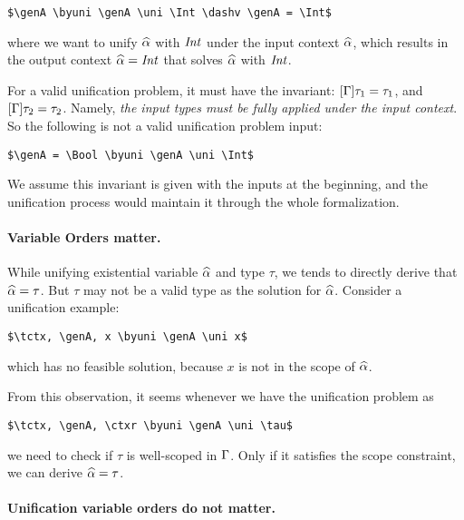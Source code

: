 \begin{lstlisting}
$\genA \byuni \genA \uni \Int \dashv \genA = \Int$
\end{lstlisting}

\noindent where we want to unify $\widehat{\alpha}$ with $\mathit{Int}$ under the input context
$\widehat{\alpha}$, which results in the output context $\widehat{\alpha} = \mathit{Int}$ that solves $\widehat{\alpha}$
with $\mathit{Int}$.

For a valid unification problem, it must have the invariant: $[\Gamma] \tau_1 =
\tau_1$, and $[\Gamma] \tau_2 = \tau_2$. Namely,
\textit{the input types must be
fully applied under the input context}.
 So the following is not a valid
unification problem input:

\begin{lstlisting}
$\genA = \Bool \byuni \genA \uni \Int$
\end{lstlisting}

We assume this invariant is given with the inputs at the beginning,
and the unification process would maintain it through the whole
formalization.

\paragraph{Variable Orders matter.}

While unifying existential variable $\widehat{\alpha}$ and type $\tau$, we tends to
directly derive that $\widehat{\alpha} = \tau$. But $\tau$ may not be a valid type as the
solution for $\widehat{\alpha}$.
Consider a unification example:

\begin{lstlisting}
$\tctx, \genA, x \byuni \genA \uni x$
\end{lstlisting}

\noindent which has no feasible solution,
because $x$ is not in the scope of $\widehat{\alpha}$.

From this observation, it seems whenever we have the unification problem as

\begin{lstlisting}
$\tctx, \genA, \ctxr \byuni \genA \uni \tau$
\end{lstlisting}

\noindent we need to check if $\tau$ is well-scoped in $\Gamma$. Only if it
satisfies the scope constraint, we can derive $\widehat{\alpha} = \tau$.

\paragraph{Unification variable orders do not matter.}

